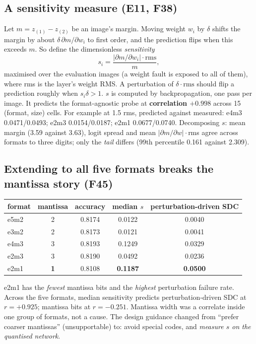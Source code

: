 \subsection{A sensitivity measure (E11, F38)}
Let $m=z_{(1)}-z_{(2)}$ be an image's margin. Moving weight $w_i$ by $\delta$ shifts the margin by about $\delta\,\partial m/\partial w_i$ to first order, and the prediction flips when this exceeds $m$. So define the dimensionless \emph{sensitivity}
\[
s_i=\frac{|\partial m/\partial w_i|\cdot\mathrm{rms}}{m},
\]
maximised over the evaluation images (a weight fault is exposed to all of them), where rms is the layer's weight RMS. A perturbation of $\delta\cdot\mathrm{rms}$ should flip a prediction roughly when $s_i\delta>1$. $s$ is computed by backpropagation, one pass per image. It predicts the format-agnostic probe at \textbf{correlation $+0.998$} across 15 (format, size) cells. For example at 1.5 rms, predicted against measured: e4m3 0.0471/0.0493; e2m3 0.0154/0.0187; e2m1 0.0677/0.0740.
Decomposing $s$: mean margin (3.59 against 3.63), logit spread and mean $|\partial m/\partial w|\cdot$rms agree across formats to three digits; only the \emph{tail} differs (99th percentile 0.161 against 2.309).

\subsection{Extending to all five formats breaks the mantissa story (F45)}
\begin{center}
\small
\begin{tabular}{lcccc}
\toprule
format & mantissa & accuracy & median $s$ & perturbation-driven SDC \\
\midrule
e5m2 & 2 & 0.8174 & 0.0122 & 0.0040 \\
e3m2 & 2 & 0.8173 & 0.0121 & 0.0041 \\
e4m3 & 3 & 0.8193 & 0.1249 & 0.0329 \\
e2m3 & 3 & 0.8190 & 0.0492 & 0.0236 \\
e2m1 & \textbf{1} & 0.8108 & \textbf{0.1187} & \textbf{0.0500} \\
\bottomrule
\end{tabular}
\end{center}
e2m1 has the \emph{fewest} mantissa bits and the \emph{highest} perturbation failure rate. Across the five formats, median sensitivity predicts perturbation-driven SDC at $r=+0.925$; mantissa bits at $r=-0.251$. Mantissa width was a correlate inside one group of formats, not a cause. The design guidance changed from ``prefer coarser mantissas'' (unsupportable) to: avoid special codes, and \emph{measure $s$ on the quantised network}.

